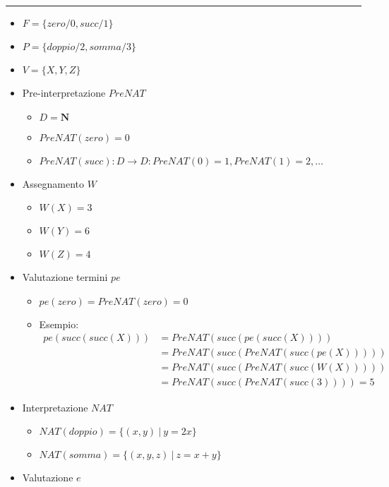 \documentclass{article}
\begin{document}
\noindent\rule{\textwidth}{0.5pt}

\begin{itemize}
    \item $F=\{zero/0,succ/1\}$
    \item $P=\{doppio/2,somma/3\}$
    \item $V=\{X,Y,Z\}$
    \item Pre-interpretazione $PreNAT$
        \begin{itemize}
            \item $D=\mathbf{N}$
            \item $PreNAT(zero)=0$
            \item $PreNAT(succ):D\rightarrow D:PreNAT(0)=1,PreNAT(1)=2,\ldots$
        \end{itemize}
    \item Assegnamento $W$
        \begin{itemize}
            \item $W(X)=3$
            \item $W(Y)=6$
            \item $W(Z)=4$
        \end{itemize}

    \item Valutazione termini $pe$
        \begin{itemize}
            \item $pe(zero)=PreNAT(zero)=0$
            \item Esempio: \begin{equation}
                \nonumber
                \begin{split}
                    pe(succ(succ(X)))&=PreNAT(succ(pe(succ(X))))\\
                    &=PreNAT(succ(PreNAT(succ(pe(X)))))\\
                    &=PreNAT(succ(PreNAT(succ(W(X)))))\\
                    &=PreNAT(succ(PreNAT(succ(3))))=5
                \end{split}
            \end{equation}
        \end{itemize}

    \item Interpretazione $NAT$
        \begin{itemize}
            \item $NAT(doppio)=\{(x,y)\ |\ y=2x\}$
            \item $NAT(somma)=\{(x,y,z)\ |\ z=x+y\}$
        \end{itemize}

    \item Valutazione $e$

\end{itemize}
\end{document}
